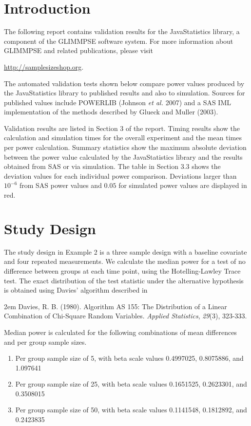 \documentclass{glimmpse-report}
\begin{document}
\section{Introduction}
The following report contains validation results for the JavaStatistics library, a component of the GLIMMPSE software system.  For more information about GLIMMPSE and related publications, please visit

 

\href{http://samplesizeshop.org}{http://samplesizeshop.org}.

The automated validation tests shown below compare power values produced by the JavaStatistics library to published results and also to simulation.  Sources for published values include POWERLIB (Johnson \emph{et al.} 2007) and a SAS IML implementation of the methods described by Glueck and Muller (2003).

Validation results are listed in Section 3 of the report.  Timing results show the calculation and simulation times for the overall experiment and the mean times per power calculation.  Summary statistics show the maximum absolute deviation between the power value calculated by the JavaStatistics library and the results obtained from SAS or via simulation.  The table in Section 3.3 shows the deviation values for each individual power comparison.  Deviations larger than $10^{-6}$ from SAS power values and $0.05$ for simulated power values are displayed in red.

 \section{Study Design}
The study design in Example 2 is a three sample design with a baseline covariate and four repeated measurements.  We calculate the median power for a test of no difference between groups at each time point, using the Hotelling-Lawley Trace test.  The exact distribution of the test statistic under the alternative hypothesis is obtained using Davies' algorithm described in 

\hangindent2em
 Davies, R. B. (1980). Algorithm AS 155: The Distribution of a Linear Combination of Chi-Square Random Variables. \emph{Applied Statistics}, \emph{29}(3), 323-333.

Median power is calculated for the following combinations of mean differences and per group sample sizes.

\begin{enumerate}\item Per group sample size of 5, with beta scale values 0.4997025, 0.8075886, and 1.097641\item Per group sample size of 25, with beta scale values 0.1651525, 0.2623301, and 0.3508015\item Per group sample size of 50, with beta scale values 0.1141548,  0.1812892, and  0.2423835
\end{enumerate}
\end{document}
